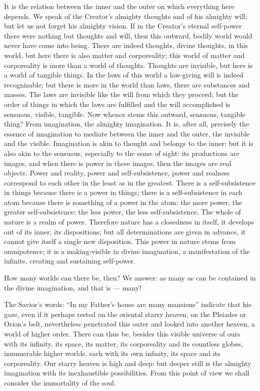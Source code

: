 \documentclass[12pt,a4paper,openany]{book}
\newcommand{\opage}[1]{\marginnote{\footnotesize\textit{[#1]}}}
\begin{document}
It is the relation between the inner and the outer on which everything here depends. We speak of the Creator's
almighty thoughts and of his almighty will; but let us not forget his almighty vision. If in the Creator's eternal
self-power there were nothing but thoughts and will, then this outward, bodily world would never have come into being.
There are indeed thoughts, divine thoughts, in this world, but here there is also matter and corporeality; this world
of matter and corporeality is more than a world of thoughts. Thoughts are invisible, but here is a world of tangible
things. In the laws of this world a law-giving will is indeed recognizable; but there is more in the world than laws,
there are
\setcounter{footnote}{0}%
\opage{23}substances and masses. The laws are invisible like the will from which they proceed; but the order of things
in which the laws are fulfilled and the will accomplished is sensuous, visible, tangible. Now whence stems this outward,
sensuous, tangible thing? From imagination, the almighty imagination. It is, after all, precisely the essence of
imagination to mediate between the inner and the outer, the invisible and the visible. Imagination is akin to thought
and belongs to the inner; but it is also akin to the sensuous, especially to the sense of sight: its productions are
images, and when there is power in these images, then the images are real objects. Power and reality, power and
self-subsistence, power and realness correspond to each other in the least as in the greatest. There is a
self-subsistence in things because there is a power in things; there is a self-subsistence in each atom because there
is something of a power in the atom: the more power, the greater self-subsistence; the less power, the less
self-subsistence. The whole of nature is a realm of power. Therefore nature has a closedness in itself, it develops
out of its inner, its dispositions; but all determinations are given in advance, it cannot give itself a single new
disposition. This power in nature stems from omnipotence; it is a making-visible in divine imagination, a manifestation
of the infinite, creating and sustaining self-power.

How many worlds can there be, then? We answer: as many as can be contained in the divine imagination, and that is ---
many!

The Savior's words: ``In my Father's house are many mansions'' indicate that his gaze, even if it
\setcounter{footnote}{0}%
\opage{24}perhaps rested on the oriental starry heaven, on the Pleiades or Orion's belt, nevertheless penetrated this
outer and looked into another heaven, a world of higher order. There can thus be, besides this visible universe of
ours with its infinity, its space, its matter, its corporeality and its countless globes, innumerable higher worlds,
each with its own infinity, its space and its corporeality. Our starry heaven is high and deep: but deeper still is
the almighty imagination with its inexhaustible possibilities. From this point of view we shall consider the
immortality of the soul.
\end{document}
